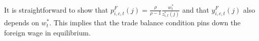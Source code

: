 \documentclass[onehalfspacing,11pt]{article}
\begin{document}
It is straightforward to show that $p_{i,c,t}^{F}(j)=\frac{\rho }{\rho -1}\frac{w_{t}^*}{z_{i,t}^*(j)}$ and that $y_{i,c,t}^{F}(j)$ also depends on $w_t^*$. This implies that the trade balance condition pins down the foreign wage in equilibrium.
%
%
\end{document}
